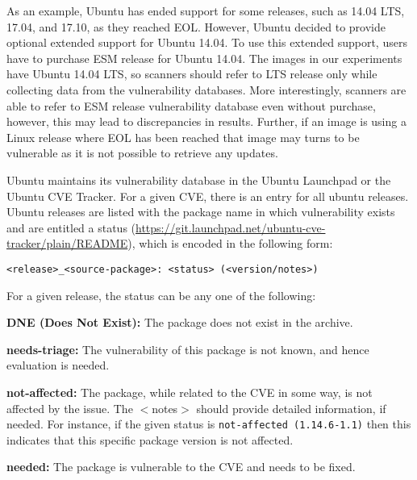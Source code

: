 As an example, Ubuntu has ended support for some releases, such as 14.04 LTS,
17.04, and 17.10, as they reached EOL. However, Ubuntu decided to provide optional extended support for Ubuntu 14.04.
To use this extended support, users have to purchase ESM release for Ubuntu 14.04.
The images in our experiments have Ubuntu 14.04 LTS, so scanners should refer
to LTS release only while collecting data from the vulnerability databases.
More interestingly, scanners are able to refer to ESM release vulnerability database
even without purchase, however, this may lead to discrepancies in results.
Further, if an image is using a Linux release where EOL has been reached that image may
turns to be vulnerable as it is not possible to retrieve any updates.

Ubuntu maintains its vulnerability database in the Ubuntu Launchpad or the Ubuntu CVE Tracker. For a given CVE, there is an entry for all ubuntu releases.
Ubuntu releases are listed with the package name
in which vulnerability exists and are entitled a status
(\href{https://git.launchpad.net/ubuntu-cve-tracker/plain/README}{https://git.launchpad.net/ubuntu-cve-tracker/plain/README}), which is
encoded in the following form:
\begin{verbatim}
<release>_<source-package>: <status> (<version/notes>)
\end{verbatim}
For a given release, the status can be any one of the following:

\noindent\textbf{DNE (Does Not Exist):} The package does not exist in the
                archive.

\noindent\textbf{needs-triage:} The vulnerability of this package
                is not known, and hence evaluation is needed.

\noindent\textbf{not-affected:} The package, while related to the
		CVE in some way, is not affected by the issue. The \(<\)notes\(>\) should
                provide detailed information, if needed. For instance, if the given
		status is \texttt{not-affected (1.14.6-1.1)} then this indicates that this specific
                package version is not affected.

\noindent\textbf{needed:} The package is vulnerable to the
                CVE and needs to be fixed.

